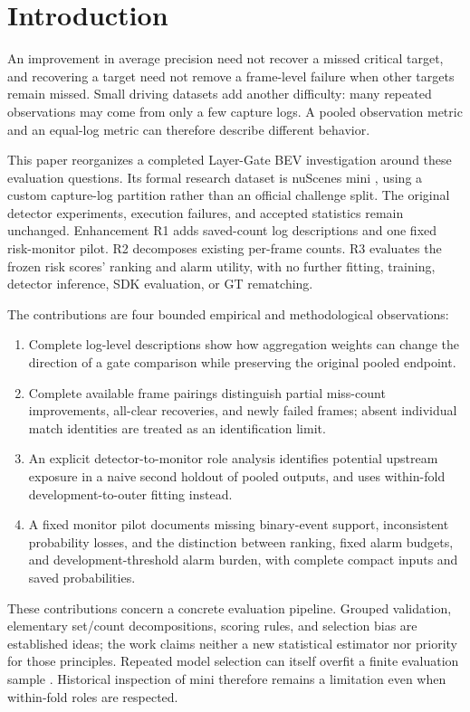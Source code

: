 \documentclass[conference]{IEEEtran}
\begin{document}
\section{Introduction}
An improvement in average precision need not recover a missed critical target, and recovering a target need not remove a frame-level failure when other targets remain missed. Small driving datasets add another difficulty: many repeated observations may come from only a few capture logs. A pooled observation metric and an equal-log metric can therefore describe different behavior.

This paper reorganizes a completed Layer-Gate BEV investigation around these evaluation questions. Its formal research dataset is nuScenes mini \cite{Caesar2020nuScenes}, using a custom capture-log partition rather than an official challenge split. The original detector experiments, execution failures, and accepted statistics remain unchanged. Enhancement R1 adds saved-count log descriptions and one fixed risk-monitor pilot. R2 decomposes existing per-frame counts. R3 evaluates the frozen risk scores' ranking and alarm utility, with no further fitting, training, detector inference, SDK evaluation, or GT rematching.

The contributions are four bounded empirical and methodological observations:
\begin{enumerate}
\item Complete log-level descriptions show how aggregation weights can change the direction of a gate comparison while preserving the original pooled endpoint.
\item Complete available frame pairings distinguish partial miss-count improvements, all-clear recoveries, and newly failed frames; absent individual match identities are treated as an identification limit.
\item An explicit detector-to-monitor role analysis identifies potential upstream exposure in a naive second holdout of pooled outputs, and uses within-fold development-to-outer fitting instead.
\item A fixed monitor pilot documents missing binary-event support, inconsistent probability losses, and the distinction between ranking, fixed alarm budgets, and development-threshold alarm burden, with complete compact inputs and saved probabilities.
\end{enumerate}
These contributions concern a concrete evaluation pipeline. Grouped validation, elementary set/count decompositions, scoring rules, and selection bias are established ideas; the work claims neither a new statistical estimator nor priority for those principles. Repeated model selection can itself overfit a finite evaluation sample \cite{Cawley2010Selection}. Historical inspection of mini therefore remains a limitation even when within-fold roles are respected.
\end{document}
